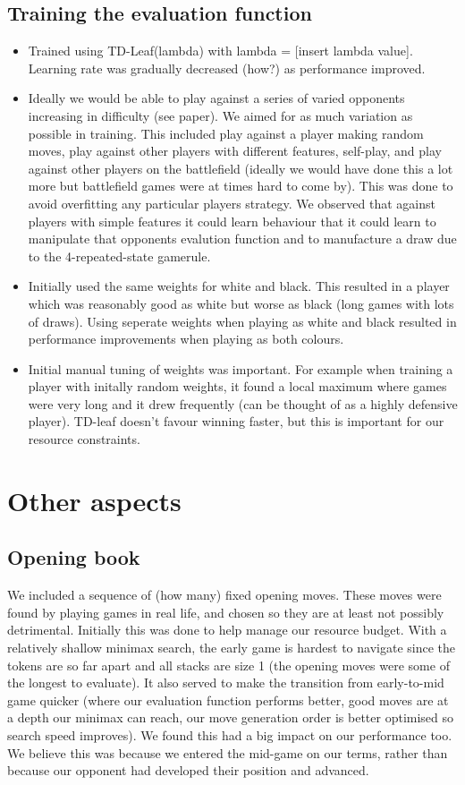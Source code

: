 \documentclass[11pt]{article}
\newcommand{\drafting}[1]{\textcolor{OliveGreen}{#1}}
\begin{document}
\subsection{Training the evaluation function}
\drafting{
    \begin{itemize}
        \item Trained using TD-Leaf(lambda) with lambda = [insert lambda value]. Learning rate was gradually decreased (how?) as performance improved.
        \item Ideally we would be able to play against a series of varied opponents increasing in difficulty (see paper). We aimed for as much variation as possible in training. This included play against a player making random moves, play against other players with different features, self-play, and play against other players on the battlefield (ideally we would have done this a lot more but battlefield games were at times hard to come by). This was done to avoid overfitting any particular players strategy. We observed that against players with simple features it could learn behaviour that it could learn to manipulate that opponents evalution function and to manufacture a draw due to the 4-repeated-state gamerule.
        \item Initially used the same weights for white and black. This resulted in a player which was reasonably good as white but worse as black (long games with lots of draws). Using seperate weights when playing as white and black resulted in performance improvements when playing as both colours.
        \item Initial manual tuning of weights was important. For example when training a player with initally random weights, it found a local maximum where games were very long and it drew frequently (can be thought of as a highly defensive player). TD-leaf doesn't favour winning faster, but this is important for our resource constraints. 
    \end{itemize}
}
\section{Other aspects}
\subsection{Opening book}
\drafting{We included a sequence of (how many) fixed opening moves. These moves were found by playing games in real life, and chosen so they are at least not possibly detrimental. Initially this was done to help manage our resource budget. With a relatively shallow minimax search, the early game is hardest to navigate since the tokens are so far apart and all stacks are size 1 (the opening moves were some of the longest to evaluate). It also served to make the transition from early-to-mid game quicker (where our evaluation function performs better, good moves are at a depth our minimax can reach, our move generation order is better optimised so search speed improves). We found this had a big impact on our performance too. We believe this was because we entered the mid-game on our terms, rather than because our opponent had developed their position and advanced.}
\end{document}
